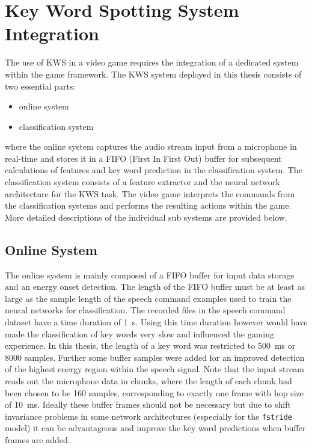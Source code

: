 
\section{Key Word Spotting System Integration}
The use of KWS in a video game requires the integration of a dedicated system within the game framework.
The KWS system deployed in this thesis consists of two essential parts:
\begin{itemize}
	\item online system
	\item classification system
\end{itemize}
where the online system captures the audio stream input from a microphone in real-time and stores it in a FIFO (First In First Out) buffer for subsequent calculations of features and key word prediction in the classification system.
The classification system consists of a feature extractor and the neural network architecture for the KWS task.
The video game interprets the commands from the classification systems and performs the resulting actions within the game.
More detailed descriptions of the individual sub systems are provided below.



\subsection{Online System}
The online system is mainly composed of a FIFO buffer for input data storage and an energy onset detection.
The length of the FIFO buffer must be at least as large as the sample length of the speech command examples used to train the neural networks for classification.
The recorded files in the speech command dataset have a time duration of \SI{1}{\second}. 
Using this time duration however would have made the classification of key words very slow and influenced the gaming experience.
In this thesis, the length of a key word was restricted to \SI{500}{\milli\second} or 8000 samples.
Further some buffer samples were added for an improved detection of the highest energy region within the speech signal.
Note that the input stream reads out the microphone data in chunks, where the length of each chunk had been chosen to be 160 samples, corresponding to exactly one frame with hop size of \SI{10}{\milli\second}.
Ideally these buffer frames should not be necessary but due to shift invariance problems in some network architectures (especially for the \texttt{fstride} model) it can be advantageous and improve the key word predictions when buffer frames are added.

